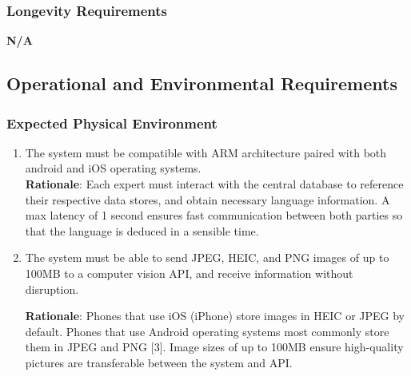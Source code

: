 \subsubsection{Longevity Requirements}
\label{ssub:longevity_requirements}
\textbf{N/A}


\subsection{Operational and Environmental Requirements}
\label{sub:operational_and_environmental_requirements}

\subsubsection{Expected Physical Environment}
\label{ssub:expected_physical_environment}
\begin{enumerate}[{OE-EPE}1. ]
	\item The system must be compatible with ARM architecture paired with both android and iOS operating systems.\\ \textbf{Rationale}: Each expert must interact with the central database to reference their respective data stores, and obtain necessary language information. A max latency of 1 second ensures fast communication between both parties so that the language is deduced in a sensible time. 
	\item The system must be able to send JPEG, HEIC, and PNG images of up to 100MB to a computer vision API, and receive information without disruption. \par  
	\textbf{Rationale}: Phones that use iOS (iPhone) store images in HEIC or JPEG by default. Phones that use Android operating systems most commonly store them in JPEG and PNG [3]. Image sizes of up to 100MB ensure high-quality pictures are transferable between the system and API.  
\end{enumerate}

